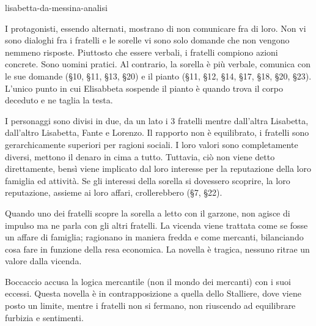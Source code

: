 \documentclass[preview]{standalone}
\begin{document}
\begin{snippet}{lisabetta-da-messina-analisi}

    I protagonisti, essendo alternati, mostrano di non comunicare fra di loro.
    Non vi sono dialoghi fra i fratelli e le sorelle vi sono solo domande che non vengono nemmeno risposte.
    Piuttosto che essere verbali, i fratelli compiono azioni concrete. Sono uomini pratici.
    Al contrario, la sorella è più verbale, comunica con le sue domande (§10, §11, §13, §20) e il pianto (§11, §12, §14, §17, §18, §20, §23).
    L'unico punto in cui Elisabbeta sospende il pianto è quando trova il corpo deceduto e ne taglia la testa.

    I personaggi sono divisi in due, da un lato i 3 fratelli mentre dall'altra Lisabetta, dall'altro Lisabetta, Fante e Lorenzo.
    Il rapporto non è equilibrato, i fratelli sono gerarchicamente superiori per ragioni sociali.
    I loro valori sono completamente diversi, mettono il denaro in cima a tutto. Tuttavia, ciò non viene detto direttamente,
    bensì viene implicato dal loro interesse per la reputazione della loro famiglia ed attività.
    Se gli interessi della sorella si dovessero scoprire, la loro reputazione, assieme ai loro affari, crollerebbero (§7, §22).

    Quando uno dei fratelli scopre la sorella a letto con il garzone, non agisce di impulso ma ne parla con gli altri fratelli.
    La vicenda viene trattata come se fosse un affare di famiglia; ragionano in maniera fredda e come mercanti, bilanciando cosa fare in funzione della resa economica.
    La novella è tragica, nessuno ritrae un valore dalla vicenda.

    Boccaccio accusa la logica mercantile (non il mondo dei mercanti) con i suoi eccessi.
    Questa novella è in contrapposizione a quella dello Stalliere, dove viene posto un limite, mentre i fratelli non si fermano, non riuscendo ad equilibrare furbizia e sentimenti.


\end{snippet}
\end{document}
